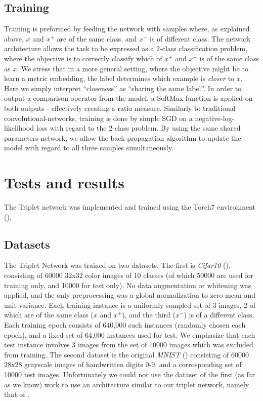 \documentclass{article} %
\begin{document}
\subsection{Training}
Training is preformed by feeding the network with samples where, as explained above, $x$ and $x^{+}$ are of the same class, and $x^{-}$ is of different class.
The network architecture allows the task to be expressed as a 2-class classification problem, where the objective is to correctly classify  which of $x^+$ and $x^-$ is of the same class as $x$.
We stress that in a more general setting, where the objective might be to learn a metric embedding, 
the label determines which example is  \emph{closer} to $x$.
Here we simply interpret ``closeness'' as ``sharing the same label''.
In order to output a comparison operator from the model,
a SoftMax function is applied on both outputs - effectively creating a ratio measure.
Similarly to traditional convolutional-networks, training is done by simple SGD on a negative-log-likelihood loss with regard to the 2-class problem.
By using the same shared parameters network, we allow the back-propagation algorithm to update the model with regard to all three samples simultaneously.

\section{Tests and results}
 The Triplet network was implemented and trained using the Torch7 environment (\citet{collobert2011torch7}).
\subsection{Datasets}

The Triplet Network was trained on two datasets.  The first is \emph{Cifar10}  (\citet{krizhevsky2009learning}), consisting of 60000 32x32 color images of 10 classes (of which 50000 are used for training only, and 10000 for test only). No data augmentation or whitening was applied, and the only preprocessing was a global normalization to zero mean and unit variance.
Each training instance is a uniformly sampled set of 3 images, 2 of which are of the same class ($x$ and $x^{+}$), and the third ($x^{-}$) is of a different class. Each training epoch consists of 640,000 such instances (randomly chosen each epoch), and a fixed set of 64,000 instances used for test. We emphasize that each test instance involves 3 images from the set of 10000 images which was excluded from training.
The second dataset is the original \emph{MNIST} (\citet{lecun1998gradient}) consisting of 60000 28x28 grayscale images of handwritten digits 0-9, and a corrosponding set of 10000 test images.
Unfortunately we could not use the dataset of the first (as far as we know) work to use an architecture similar
to our triplet network, namely that of \cite{WangSLRWPCW2014}.
\end{document}
